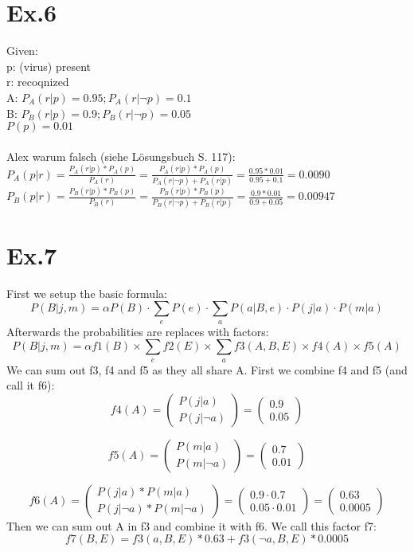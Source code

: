 \documentclass[11pt]{article}
\begin{document}
\section*{Ex.6}

Given:\\
p: (virus) present\\
r: recoqnized\\
A: $P_A(r|p)=0.95; P_A(r|\neg p)=0.1$\\
B: $P_B(r|p)=0.9; P_B(r|\neg p)=0.05$\\
$P(p)=0.01$\\
\\
Alex warum falsch (siehe Lösungsbuch S. 117):\\
$P_A(p|r)=\frac{P_A(r|p)*P_A(p)}{P_A(r)}=\frac{P_A(r|p)*P_A(p)}{P_A(r|\neg p)+P_A(r|p)}=\frac{0.95*0.01}{0.95+0.1}=0.0090$\\
$P_B(p|r)=\frac{P_B(r|p)*P_B(p)}{P_B(r)}=\frac{P_B(r|p)*P_B(p)}{P_B(r|\neg p)+P_B(r|p)}=\frac{0.9*0.01}{0.9+0.05}=0.00947$\\

\section*{Ex.7}

First we setup the basic formula:
$$P(B|j,m) = \alpha P(B) \cdot \sum_{e}P(e) \cdot \sum_{a}P(a|B,e) \cdot P(j|a) \cdot P(m|a)$$
Afterwards the probabilities are replaces with factors:
$$P(B|j,m) = \alpha f1(B) \times \sum_{e}f2(E) \times \sum_{a}f3(A,B,E) \times f4(A) \times f5(A)$$
We can sum out f3, f4 and f5 as they all share A. First we combine f4 and f5 (and call it f6):
$$ f4(A) = 
\begin{pmatrix}
  P(j|a) \\
  P(j|\neg a)
\end{pmatrix}
 = 
\begin{pmatrix}
  0.9 \\
  0.05
\end{pmatrix}
$$ 
 
$$ f5(A) = 
\begin{pmatrix}
  P(m|a) \\
  P(m|\neg a)
\end{pmatrix}
 = 
\begin{pmatrix}
  0.7 \\
  0.01
\end{pmatrix}
$$ 

$$ f6(A) = 
\begin{pmatrix}
  P(j|a)*P(m|a) \\
  P(j|\neg a)*P(m|\neg a)
\end{pmatrix}
 = 
\begin{pmatrix}
  0.9 \cdot 0.7 \\
  0.05 \cdot 0.01
\end{pmatrix}
 = 
\begin{pmatrix}
  0.63 \\
  0.0005
\end{pmatrix}
$$ 
Then we can sum out A in f3 and combine it with f6. We call this factor f7:
$$
  f7(B,E) = f3(a,B,E) * 0.63 + f3(\neg a,B,E) * 0.0005
$$
\end{document}
